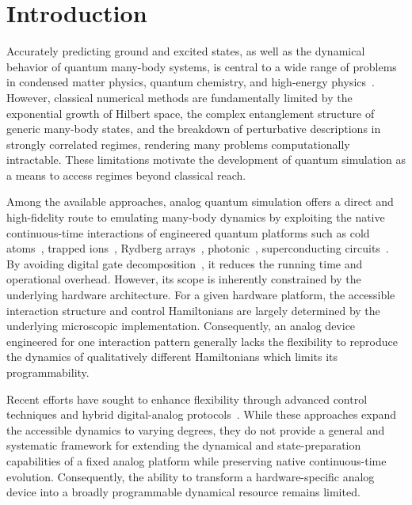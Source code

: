 \documentclass[twocolumn,
pra,aps,superscriptaddress,showpacs,amsmath,amssymb]{revtex4-2}
\begin{document}
\section{Introduction}

Accurately predicting ground and excited states, as well as the dynamical behavior of quantum many-body systems, is central to a wide range of problems in condensed matter physics, quantum chemistry, and high-energy physics~\cite{feynman2018simulating,georgescu2014quantum,mcardle2020quantum,di2024quantum,miessen2023quantum}. However, classical numerical methods are fundamentally limited by the exponential growth of Hilbert space, the complex entanglement structure of generic many-body states, and the breakdown of perturbative descriptions in strongly correlated regimes, rendering many problems computationally intractable. These limitations motivate the development of quantum simulation as a means to access regimes beyond classical reach.

Among the available approaches, analog quantum simulation offers a direct and high-fidelity route to emulating many-body dynamics by exploiting the native continuous-time interactions of engineered quantum platforms such as cold atoms~\cite{gross2017quantum}, trapped ions~\cite{wu2016understanding,blatt2012quantum}, Rydberg arrays~\cite{browaeys2020many}, photonic~\cite{aspuru2012photonic}, superconducting circuits~\cite{daley2022practical,monroe2021programmable,houck2012chip,altman2021quantum}. By avoiding digital gate decomposition~\cite{lloyd1996universal,lanyon2011universal,kamakari2022digital,fischer2026enabling}, it reduces the running time and operational overhead. However, its scope is inherently constrained by the underlying hardware architecture. For a given hardware platform, the accessible interaction structure and control Hamiltonians are largely determined by the underlying microscopic implementation. Consequently, an analog device engineered for one interaction pattern generally lacks the flexibility to reproduce the dynamics of qualitatively different Hamiltonians which limits its programmability.

Recent efforts have sought to enhance flexibility through advanced control techniques and hybrid digital-analog protocols~\cite{eckardt2017colloquium,babukhin2020hybrid,gonzalez2021ditital,celeri2023digital,garcia2025hamiltonian,kumar2025digital,fauseweh2024quantum}. While these approaches expand the accessible dynamics to varying degrees, they do not provide a general and systematic framework for extending the dynamical and state-preparation capabilities of a fixed analog platform while preserving native continuous-time evolution. Consequently, the ability to transform a hardware-specific analog device into a broadly programmable dynamical resource remains limited.
\end{document}
